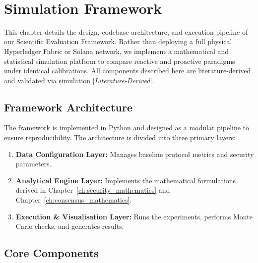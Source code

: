 \documentclass[12pt, oneside, a4paper]{report}
\theoremstyle{definition}
\theoremstyle{remark}
\newcommand{\litderived}{[\textit{Literature-Derived}]}
\begin{document}

\cleardoublepage


﻿%
\chapter{Simulation Framework}
\label{ch:simulation_framework}

This chapter details the design, codebase architecture, and execution pipeline of our Scientific Evaluation Framework. Rather than deploying a full physical Hyperledger Fabric or Solana network, we implement a mathematical and statistical simulation platform to compare reactive and proactive paradigms under identical calibrations. All components described here are literature-derived and validated via simulation \litderived.

\section{Framework Architecture}
\label{sec:sf:architecture}

The framework is implemented in Python and designed as a modular pipeline to ensure reproducibility. The architecture is divided into three primary layers:
\begin{enumerate}
  \item \textbf{Data Configuration Layer:} Manages baseline protocol metrics and security parameters.
  \item \textbf{Analytical Engine Layer:} Implements the mathematical formulations derived in Chapter~\ref{ch:security_mathematics} and Chapter~\ref{ch:consensus_mathematics}.
  \item \textbf{Execution & Visualisation Layer:} Runs the experiments, performs Monte Carlo checks, and generates results.
\end{enumerate}

\section{Core Components}
\label{sec:sf:components}
\end{document}
